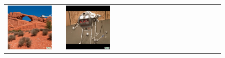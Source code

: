\begin{figure}[ht!]
\begin{adjustwidth}{-0.8in}{-0.5in}
\begin{tabular}{cccccccccccccccccccc}
\multicolumn{2}{c}{\includegraphics[width=\threebythreecolwidth\textwidth]{figures/cherries/arches3.jpg}} &&
\multicolumn{2}{c}{\includegraphics[width=\threebythreecolwidth\textwidth]{figures/cherries/metal1.jpg}} &

\end{tabular}
\end{adjustwidth}
\end{figure}
